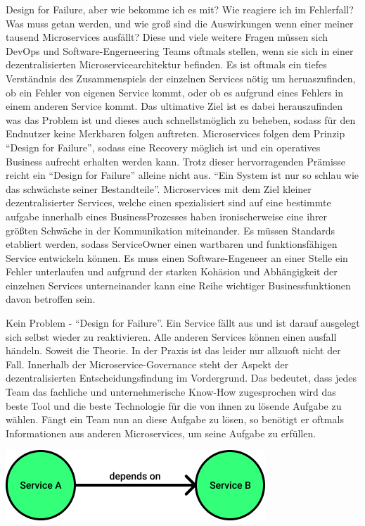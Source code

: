 Design for Failure, aber wie bekomme ich es mit? Wie reagiere ich im Fehlerfall? Was muss getan werden, und wie groß sind die Auswirkungen wenn einer meiner tausend Microservices ausfällt? Diese und viele weitere Fragen müssen sich DevOps und Software-Engerneering Teams oftmals stellen, wenn sie sich in einer dezentralisierten Microservicearchitektur befinden. Es ist oftmals ein tiefes Verständnis des Zusammenspiels der einzelnen Services nötig um heruaszufinden, ob ein Fehler von eigenen Service kommt, oder ob es aufgrund eines Fehlers in einem anderen Service kommt. Das ultimative Ziel ist es dabei herauszufinden was das Problem ist und dieses auch schnellstmöglich zu beheben, sodass für den Endnutzer keine Merkbaren folgen auftreten. Microservices folgen dem Prinzip \enquote{Design for Failure}, sodass eine Recovery möglich ist und ein operatives Business aufrecht erhalten werden kann. Trotz dieser hervorragenden Prämisse reicht ein \enquote{Design for Failure} alleine nicht aus. \enquote{Ein System ist nur so schlau wie das schwächste seiner Bestandteile}. Microservices mit dem Ziel kleiner dezentralisierter Services, welche einen spezialisiert sind auf eine bestimmte aufgabe innerhalb eines BusinessProzesses haben ironischerweise eine ihrer größten Schwäche in der Kommunikation miteinander. Es müssen Standards etabliert werden, sodass ServiceOwner einen wartbaren und funktionsfähigen Service entwickeln können. Es muss einen Software-Engeneer an einer Stelle ein Fehler unterlaufen und aufgrund der starken Kohäsion und Abhängigkeit der einzelnen Services unterneinander kann eine Reihe wichtiger Businessfunktionen davon betroffen sein.

Kein Problem - \enquote{Design for Failure}. Ein Service fällt aus und ist darauf ausgelegt sich selbst wieder zu reaktivieren. Alle anderen Services können einen ausfall händeln. Soweit die Theorie. In der Praxis ist das leider nur allzuoft nicht der Fall. Innerhalb der Microservice-Governance steht der Aspekt der dezentralisierten Entscheidungsfindung im Vordergrund. Das bedeutet, dass jedes Team das fachliche und unternehmerische Know-How zugesprochen wird das beste Tool und die beste Technologie für die von ihnen zu lösende Aufgabe zu wählen. Fängt ein Team nun an diese Aufgabe zu lösen, so benötigt er oftmals Informationen aus anderen Microservices, um seine Aufgabe zu erfüllen. 


\begin{center}
	\includegraphics[width=0.55\linewidth]{img/service_dependency.png}
\end{center}

